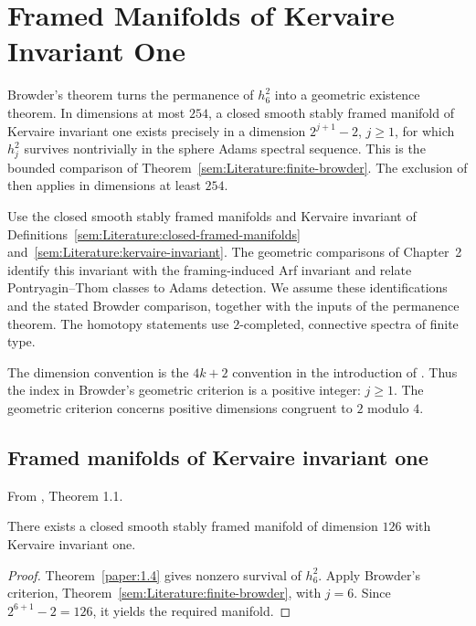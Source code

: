 \chapter{Framed Manifolds of Kervaire Invariant One}
Browder's theorem turns the permanence of $h_6^2$ into a geometric
existence theorem. In dimensions at most $254$, a closed smooth stably
framed manifold of Kervaire invariant one exists precisely in a dimension
$2^{j+1}-2$, $j\ge1$, for which $h_j^2$ survives nontrivially in the
sphere Adams spectral sequence. This is the bounded comparison of
Theorem~\ref{sem:Literature:finite-browder}. The exclusion of \cite{HHR}
then applies in dimensions at least $254$.

Use the closed smooth stably framed manifolds and Kervaire invariant of
Definitions~\ref{sem:Literature:closed-framed-manifolds}
and~\ref{sem:Literature:kervaire-invariant}. The geometric comparisons
of Chapter~2 identify this invariant with the framing-induced Arf
invariant and relate Pontryagin--Thom classes to Adams detection.
We assume these identifications and the stated Browder comparison,
together with the inputs of the permanence theorem. The homotopy
statements use $2$-completed, connective spectra of finite type.

The dimension convention is the $4k+2$ convention in the introduction of
\cite{LWX126}. Thus the index in Browder's geometric criterion is a positive
integer: $j\geq 1$. The geometric criterion concerns positive dimensions congruent to $2$ modulo $4$.
\section{Framed manifolds of Kervaire invariant one}
\begin{theorem}
\label{paper:1.1}
From \cite{LWX126}, Theorem 1.1.\par

\label{thm:main}
There exists a closed smooth stably framed manifold of dimension $126$
with Kervaire invariant one.



\end{theorem}
\begin{proof}
Theorem~\ref{paper:1.4} gives nonzero survival of $h_6^2$. Apply
Browder's criterion, Theorem~\ref{sem:Literature:finite-browder}, with
$j=6$. Since $2^{6+1}-2=126$, it yields the required manifold.
\end{proof}


